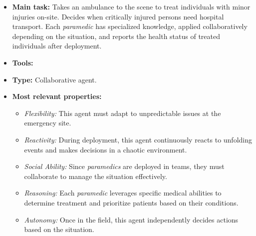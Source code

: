 \begin{itemize}
    \item \textbf{Main task:} Takes an ambulance to the scene to treat individuals with minor injuries on-site. Decides when critically injured persons need hospital transport. Each \textit{paramedic} has specialized knowledge, applied collaboratively depending on the situation, and reports the health status of treated individuals after deployment.
    \item \textbf{Tools:}
    \item \textbf{Type:} Collaborative agent.
    \item \textbf{Most relevant properties:}
    \begin{itemize}
        \item \textit{Flexibility:} This agent must adapt to unpredictable issues at the emergency site.
        \item \textit{Reactivity:} During deployment, this agent continuously reacts to unfolding events and makes decisions in a chaotic environment.
        \item \textit{Social Ability:} Since \textit{paramedics} are deployed in teams, they must collaborate to manage the situation effectively.
        \item \textit{Reasoning:} Each \textit{paramedic} leverages specific medical abilities to determine treatment and prioritize patients based on their conditions.
        \item \textit{Autonomy:} Once in the field, this agent independently decides actions based on the situation.
    \end{itemize}
\end{itemize}
